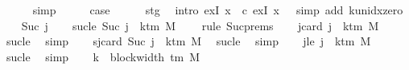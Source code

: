 \begin{isabellebody}
\ \ \ \ \isamarkupfalse%
\ simp\isanewline
\ \ \isamarkupfalse%
\ \isamarkupfalse%
\ {\isacharquery}{\kern0pt}case\isanewline
\ \ \ \ \isamarkupfalse%
\ stg{}\ \isamarkupfalse%
\ {\isacharparenleft}{\kern0pt}intro\ exI{\isacharbrackleft}{\kern0pt}\ x\ {\isacharequal}{\kern0pt}\ c{}{\isacharbrackright}{\kern0pt}\ exI{\isacharbrackleft}{\kern0pt}\ x\ {\isacharequal}{\kern0pt}\ {}{\isacharbrackright}{\kern0pt}{\isacharparenright}{\kern0pt}\ {\isacharparenleft}{\kern0pt}simp\ add{\isacharcolon}{\kern0pt}\ k{\isacharunderscore}{\kern0pt}unidx{\isacharunderscore}{\kern0pt}zero{\isacharparenright}{\kern0pt}\isanewline
{}\isamarkupfalse%
\isanewline
\ \ \isamarkupfalse%
\ {\isacharparenleft}{\kern0pt}Suc\ j{\isacharparenright}{\kern0pt}\isanewline
\ \ \isamarkupfalse%
\ sucle{\isacharcolon}{\kern0pt}\ {\isachardoublequoteopen}Suc\ j\ {\isasymle}\ k{\isacharunderscore}{\kern0pt}tm\ M\ {\isacharminus}{\kern0pt}\ {}{\isachardoublequoteclose}\ \isamarkupfalse%
\ {\isacharparenleft}{\kern0pt}rule\ Suc{\isachardot}{\kern0pt}prems{\isacharparenright}{\kern0pt}\isanewline
\ \ \isamarkupfalse%
\ jcard{\isacharcolon}{\kern0pt}\ {\isachardoublequoteopen}j\ {\isacharless}{\kern0pt}\ k{\isacharunderscore}{\kern0pt}tm\ M{\isachardoublequoteclose}\ \isamarkupfalse%
\ sucle\ \isamarkupfalse%
\ simp\isanewline
\ \ \isamarkupfalse%
\ sjcard{\isacharcolon}{\kern0pt}\ {\isachardoublequoteopen}Suc\ j\ {\isacharless}{\kern0pt}\ k{\isacharunderscore}{\kern0pt}tm\ M{\isachardoublequoteclose}\ \isamarkupfalse%
\ sucle\ \isamarkupfalse%
\ simp\isanewline
\ \ \isamarkupfalse%
\ jle{\isacharcolon}{\kern0pt}\ {\isachardoublequoteopen}j\ {\isasymle}\ k{\isacharunderscore}{\kern0pt}tm\ M\ {\isacharminus}{\kern0pt}\ {}{\isachardoublequoteclose}\ \isamarkupfalse%
\ sucle\ \isamarkupfalse%
\ simp\isanewline
\ \ \isamarkupfalse%
\ {\isacharquery}{\kern0pt}k\ {\isacharequal}{\kern0pt}\ {\isachardoublequoteopen}block{\isacharunderscore}{\kern0pt}width\ {\isacharparenleft}{\kern0pt}{\isasymGamma}{\isacharunderscore}{\kern0pt}tm\ M{\isacharparenright}{\kern0pt}{\isachardoublequoteclose}\isanewline
\ \ \isamarkupfalse%

\end{isabellebody}
